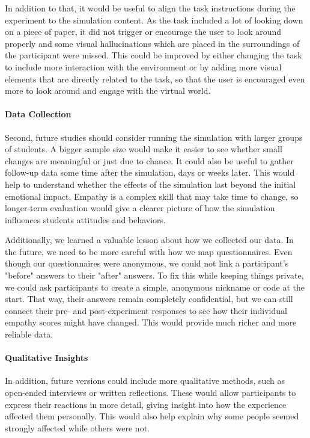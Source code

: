 \vspace{1em}

In addition to that, it would be useful to align the task instructions during the experiment to the simulation content. As the task included a lot of looking down on a piece of paper, it did not trigger or encourage the user to look around properly and some visual hallucinations which are placed in the surroundings of the participant were missed. This could be improved by either changing the task to include more interaction with the environment or by adding more visual elements that are directly related to the task, so that the user is encouraged even more to look around and engage with the virtual world.

\paragraph{Data Collection} Second, future studies should consider running the simulation with larger groups of students. A bigger sample size would make it easier to see whether small changes are meaningful or just due to chance. It could also be useful to gather follow-up data some time after the simulation, days or weeks later. This would help to understand whether the effects of the simulation last beyond the initial emotional impact. Empathy is a complex skill that may take time to change, so longer-term evaluation would give a clearer picture of how the simulation influences students attitudes and behaviors.

\vspace{1em}

Additionally, we learned a valuable lesson about how we collected our data. In the future, we need to be more careful with how we map questionnaires. Even though our questionnaires were anonymous, we could not link a participant's "before" answers to their "after" answers. To fix this while keeping things private, we could ask participants to create a simple, anonymous nickname or code at the start. That way, their answers remain completely confidential, but we can still connect their pre- and post-experiment responses to see how their individual empathy scores might have changed. This would provide much richer and more reliable data.

\paragraph{Qualitative Insights} In addition, future versions could include more qualitative methods, such as open-ended interviews or written reflections. These would allow participants to express their reactions in more detail, giving insight into how the experience affected them personally. This would also help explain why some people seemed strongly affected while others were not.

